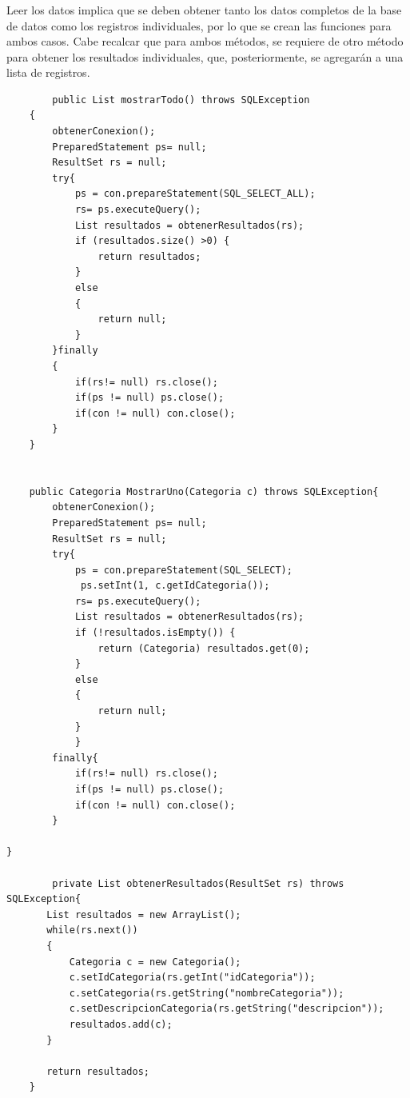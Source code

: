 \documentclass[10pt,a4paper]{article}
\begin{document}
\subsubsection{\color{colorGENERICO}{Leer}}
\normalsize{
Leer los datos implica que se deben obtener tanto los datos completos de la base de datos
como los registros individuales, por lo que se crean las funciones para ambos casos. Cabe
recalcar que para ambos métodos, se requiere de otro método para obtener los resultados individuales, que, posteriormente, se agregarán a una lista de registros.
}

\begin{lstlisting}
	    public List mostrarTodo() throws SQLException
    {
        obtenerConexion();
        PreparedStatement ps= null;
        ResultSet rs = null;
        try{
            ps = con.prepareStatement(SQL_SELECT_ALL);
            rs= ps.executeQuery();
            List resultados = obtenerResultados(rs);
            if (resultados.size() >0) {
                return resultados;
            }
            else
            {
                return null;
            }
        }finally
        {
            if(rs!= null) rs.close();
            if(ps != null) ps.close();
            if(con != null) con.close();   
        }
    }
    
    
    public Categoria MostrarUno(Categoria c) throws SQLException{
        obtenerConexion();
        PreparedStatement ps= null;
        ResultSet rs = null;
        try{
            ps = con.prepareStatement(SQL_SELECT);
             ps.setInt(1, c.getIdCategoria());
            rs= ps.executeQuery();
            List resultados = obtenerResultados(rs);
            if (!resultados.isEmpty()) {
                return (Categoria) resultados.get(0);
            }
            else
            {
                return null;
            }
            }
        finally{
            if(rs!= null) rs.close();
            if(ps != null) ps.close();
            if(con != null) con.close(); 
        }
  
}
    
        private List obtenerResultados(ResultSet rs) throws SQLException{
       List resultados = new ArrayList();
       while(rs.next())
       {
           Categoria c = new Categoria();
           c.setIdCategoria(rs.getInt("idCategoria"));
           c.setCategoria(rs.getString("nombreCategoria"));
           c.setDescripcionCategoria(rs.getString("descripcion"));
           resultados.add(c);
       }
       
       return resultados;
    }

\end{lstlisting} \hfill
\end{document}
